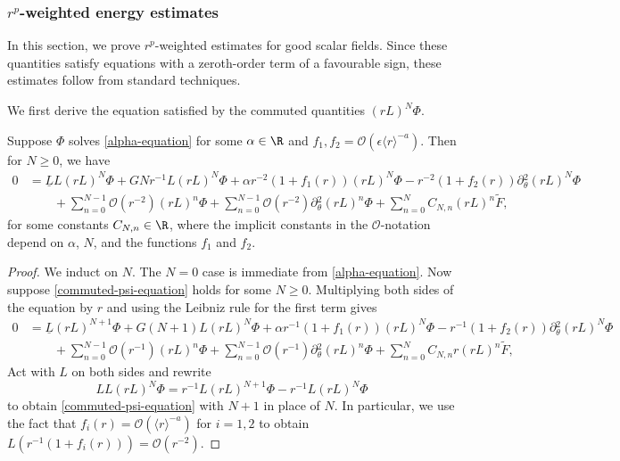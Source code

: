 \documentclass[10pt, reqno]{amsart}
\begin{document}
\subsubsection{\(r^p\)-weighted energy estimates}
\label{sec:rp-good}
In this section, we prove \(r^p\)-weighted estimates for good scalar fields.
Since these quantities satisfy equations with a zeroth-order term of a
favourable sign, these estimates follow from standard techniques.

We first derive the equation satisfied by the commuted quantities \((rL)^N\Phi{}\).
\begin{lemma}
Suppose \(\Phi{}\) solves \cref{alpha-equation} for some \(\alpha{}\in \R\) and
\(f_1,f_2=\mathcal{O}(\epsilon{}\langle{}r\rangle^{-a})\). Then for \(N\ge 0\), we have
\begin{equation}\label{commuted-psi-equation}
\begin{split}
0 &= \underline{L}L(rL)^N\Phi{} + GNr^{-1}L(rL)^N\Phi{} + \alpha{}r^{-2}(1+f_1(r))(rL)^N\Phi{} - r^{-2}(1+f_2(r))\partial{}_\theta^2(rL)^N\Phi{} \\
&\qquad + \sum_{n=0}^{N-1}\mathcal{O}(r^{-2})(rL)^n\Phi{} + \sum_{n=0}^{N-1} \mathcal{O}(r^{-2})\partial{}_\theta^2(rL)^n\Phi{} + \sum_{n=0}^NC_{N,n}(rL)^n\tilde{F},
\end{split}
\end{equation}
for some constants \(C_{N,n}\in \R\), where the implicit constants in the
\(\mathcal{O}\)-notation depend on \(\alpha{}\), \(N\), and the functions \(f_1\) and
\(f_2\).
\label{commuted-psi}
\end{lemma}
\begin{proof}
We induct on \(N\). The \(N = 0\) case is immediate from \cref{alpha-equation}. Now
suppose \cref{commuted-psi-equation} holds for some \(N\ge 0\). Multiplying both
sides of the equation by \(r\) and using the Leibniz rule for the first term
gives
\begin{equation}\label{commuted-psi-prep}
\begin{split}
0 &= \underline{L}(rL)^{N+1}\Phi{} + G(N+1)L(rL)^N\Phi{} + \alpha{}r^{-1}(1+f_1(r))(rL)^N\Phi{} - r^{-1}(1+f_2(r))\partial{}_\theta^2(rL)^N\Phi{} \\
&\qquad + \sum_{n=0}^{N-1}\mathcal{O}(r^{-1})(rL)^n\Phi{} + \sum_{n=0}^{N-1} \mathcal{O}(r^{-1})\partial{}_\theta^2(rL)^n\Phi{} + \sum_{n=0}^{N}C_{N,n}r(rL)^n\tilde{F},
\end{split}
\end{equation}
Act with \(L\) on both sides and rewrite
\begin{equation}
LL(rL)^N\Phi{} = r^{-1}L(rL)^{N+1}\Phi{} - r^{-1}L(rL)^N\Phi{}
\end{equation}
to obtain \cref{commuted-psi-equation} with \(N + 1\) in place of \(N\). In
particular, we use the fact that \(f_i(r) =
\mathcal{O}(\langle{}r\rangle^{-a})\) for \(i = 1,2\) to obtain \(L(r^{-1}(1 +
f_i(r))) = \mathcal{O}(r^{-2})\).
\end{proof}
\end{document}
